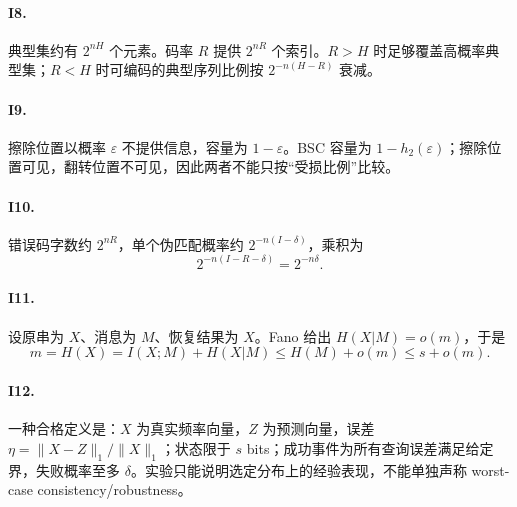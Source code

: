 \paragraph{I8.}
典型集约有 $2^{nH}$ 个元素。码率 $R$ 提供 $2^{nR}$ 个索引。$R>H$ 时足够覆盖高概率典型集；$R<H$ 时可编码的典型序列比例按 $2^{-n(H-R)}$ 衰减。

\paragraph{I9.}
擦除位置以概率 $\varepsilon$ 不提供信息，容量为 $1-\varepsilon$。BSC 容量为 $1-h_2(\varepsilon)$；擦除位置可见，翻转位置不可见，因此两者不能只按“受损比例”比较。

\paragraph{I10.}
错误码字数约 $2^{nR}$，单个伪匹配概率约 $2^{-n(I-\delta)}$，乘积为
\[
2^{-n(I-R-\delta)}=2^{-n\delta}.
\]

\paragraph{I11.}
设原串为 $X$、消息为 $M$、恢复结果为 $\hat X$。Fano 给出 $H(X|M)=o(m)$，于是
\[
m=H(X)=I(X;M)+H(X|M)\le H(M)+o(m)\le s+o(m).
\]

\paragraph{I12.}
一种合格定义是：$X$ 为真实频率向量，$Z$ 为预测向量，误差 $\eta=\|X-Z\|_1/\|X\|_1$；状态限于 $s$ bits；成功事件为所有查询误差满足给定界，失败概率至多 $\delta$。实验只能说明选定分布上的经验表现，不能单独声称 worst-case consistency/robustness。
